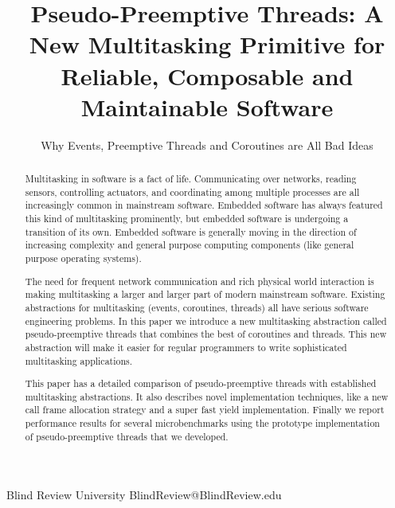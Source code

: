 \documentclass[9pt,preprint]{sigplanconf-2}
\begin{document}
\newcommand{\charcoal}{BlindReview}
\newcommand{\noyield}{\texttt{no\_yield}}

\setlength{\pdfpageheight}{\paperheight}
\setlength{\pdfpagewidth}{\paperwidth}



\title{Pseudo-Preemptive Threads: A New Multitasking Primitive for Reliable, Composable and Maintainable Software}
\subtitle{Why Events, Preemptive Threads and Coroutines are All Bad Ideas\footnotemark}

           {Blind Review University}
           {BlindReview@BlindReview.edu}

\maketitle

\begin{abstract}

Multitasking in software is a fact of life.
Communicating over networks, reading sensors, controlling actuators, and coordinating among multiple processes are all increasingly common in mainstream software.
Embedded software has always featured this kind of multitasking prominently, but embedded software is undergoing a transition of its own.
Embedded software is generally moving in the direction of increasing complexity and general purpose computing components (like general purpose operating systems).
  
The need for frequent network communication and rich physical world interaction is making multitasking a larger and larger part of modern mainstream software.
Existing abstractions for multitasking (events, coroutines, threads) all have serious software engineering problems.
In this paper we introduce a new multitasking abstraction called pseudo-preemptive threads that combines the best of coroutines and threads.
This new abstraction will make it easier for regular programmers to write sophisticated multitasking applications.

This paper has a detailed comparison of pseudo-preemptive threads with established multitasking abstractions.
It also describes novel implementation techniques, like a new call frame allocation strategy and a super fast yield implementation.
Finally we report performance results for several microbenchmarks using the prototype implementation of pseudo-preemptive threads that we developed.

\end{abstract}
\end{document}
